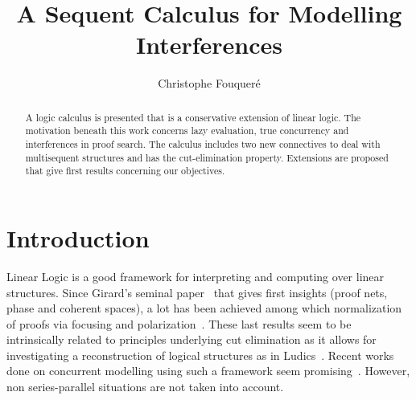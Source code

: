 \documentclass{llncs}
\begin{document}
\pagestyle{plain} \mainmatter       

\title{A Sequent Calculus for Modelling Interferences}

\author{Christophe Fouquer\'e}


\maketitle

\begin{abstract}
A logic calculus is presented that is a conservative extension of linear logic. 
The motivation beneath this work concerns lazy evaluation,
true concurrency and interferences in proof search.
The calculus includes two new connectives to deal with multisequent structures and has the cut-elimination property. Extensions are proposed that give first results concerning our objectives.
\end{abstract}

\section{Introduction}\label{sec:introduction}




Linear Logic is a good framework for interpreting and computing over linear structures.
Since Girard's seminal paper~\cite{Girard87} that gives first insights (proof nets, phase and coherent spaces), a lot has been achieved among which normalization of proofs via focusing and polarization~\cite{Andreoli92,Laurent05a}. These last results seem to be intrinsically related to principles underlying cut elimination as it allows for investigating a reconstruction of logical structures as in Ludics~\cite{Girard01}.
Recent works done on concurrent modelling using such a framework seem promising~\cite{DBLP:conf/csl/CurienF05,DBLP:conf/csl/GiamberardinoF06}.
However, non series-parallel situations are not taken into account.
\end{document}
